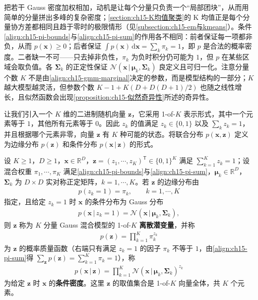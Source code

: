 \documentclass[../../main.tex]{subfiles}
\begin{document}
\begin{remark}
把若干 Gauss 密度加权相加，动机是让每个分量只负责一个“局部团块”，从而用简单的分量拼出多峰的复杂密度；\cref{section:ch15-K均值聚类}的 K 均值正是每个分量协方差都相同且趋于零时的极限情形（见\cref{subsection:ch15-em与kmeans}）。条件\eqref{align:ch15-pi-bounds}与\eqref{align:ch15-pi-sum}的作用各不相同：前者保证每一项都非负，从而 $p(\bm{x})\geqslant0$；后者保证 $\int p(\bm{x})\,\mathrm{d}\bm{x}=\sum_k\pi_k=1$，即 $p$ 是合法的概率密度。二者缺一不可——只去掉非负性，$\pi_k$ 为负时积分仍可能为 $1$，但 $p$ 在某些区域会取负值。各 $\bm{\Sigma}_k$ 的正定性保证 $\mathcal{N}(\bm{x}\,|\,\bm{\mu}_k,\bm{\Sigma}_k)$ 良定义且可归一化。注意分量个数 $K$ 不是由\eqref{align:ch15-gmm-marginal}决定的参数，而是模型结构的一部分；$K$ 越大模型越灵活，但参数个数 $K-1+K(D+D(D+1)/2)$ 也随之线性增长，且似然函数会出现\cref{proposition:ch15-似然奇异性}所述的奇异性。
\end{remark}

让我们引入一个 $K$ 维的二进制随机向量 $\bm{z}$，它采用 1-of-$K$ 表示形式，其中一个元素等于 $1$，其他所有元素等于 $0$。因此 $z_k$ 的值满足 $z_k\in\{0,1\}$ 以及 $\sum_k z_k=1$，并且根据哪个元素非零，向量 $\bm{z}$ 有 $K$ 种可能的状态。将联合分布 $p(\bm{x},\bm{z})$ 定义为边缘分布 $p(\bm{z})$ 和条件分布 $p(\bm{x}\,|\,\bm{z})$ 的形式。

\begin{definition}[1-of-$K$ 离散潜变量表示]\label{definition:ch15-离散潜变量}
设 $K\geqslant1$，$D\geqslant1$，$\bm{x}\in\mathbb{R}^{D}$，$\bm{z}=(z_1,\cdots,z_K)^{\mathsf T}\in\{0,1\}^{K}$ 满足 $\sum_{k=1}^{K}z_k=1$；设混合权重 $\pi_1,\cdots,\pi_K$ 满足\eqref{align:ch15-pi-bounds}与\eqref{align:ch15-pi-sum}，$\bm{\mu}_k\in\mathbb{R}^{D}$，$\bm{\Sigma}_k$ 为 $D\times D$ 实对称正定矩阵，$k=1,\cdots,K$。若 $\bm{z}$ 的边缘分布由
\begin{align*}
p(z_k=1)=\pi_k,\qquad k=1,\cdots,K
\end{align*}
指定，且给定 $z_k=1$ 时 $\bm{x}$ 的条件分布为 Gauss 分布
\begin{align*}
p(\bm{x}\,|\,z_k=1)=\mathcal{N}(\bm{x}\,|\,\bm{\mu}_k,\bm{\Sigma}_k),
\end{align*}
则 $\bm{z}$ 称为 $K$ 分量 Gauss 混合模型的 1-of-$K$ \textbf{离散潜变量}，并称
\begin{align}
p(\bm{z})=\prod_{k=1}^{K}\pi_k^{z_k}
\label{align:ch15-prior-factorized}
\end{align}
为 $\bm{z}$ 的概率质量函数（右端只有满足 $z_k=1$ 的因子 $\pi_k$ 不等于 $1$，由\eqref{align:ch15-pi-sum}得 $\sum_{\bm{z}}p(\bm{z})=\sum_{k=1}^{K}\pi_k=1$），称
\begin{align}
p(\bm{x}\,|\,\bm{z})=\prod_{k=1}^{K}\mathcal{N}(\bm{x}\,|\,\bm{\mu}_k,\bm{\Sigma}_k)^{z_k}
\label{align:ch15-conditional-x}
\end{align}
为给定 $\bm{z}$ 时 $\bm{x}$ 的\textbf{条件密度}。这里 $\bm{z}$ 的取值集合是 1-of-$K$ 向量全体，共 $K$ 个元素。
\end{definition}
\end{document}
